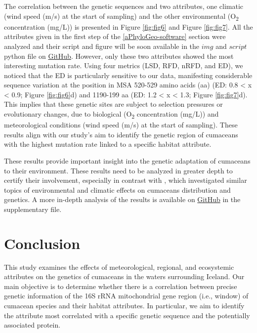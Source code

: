 The correlation between the genetic sequences and two attributes, one climatic (wind speed (m/s) at the start of sampling) and the other environmental (O\textsubscript{2} concentration (mg/L)) is presented in Figure \ref{fig:fig6} and Figure \ref{fig:fig7}. All the attributes given in the first step of the \autoref{aPhyloGeo-software} section were analyzed and their script and figure will be soon available in the $img$ and $script$ python file on \href{https://github.com/tahiri-lab/Cumacea_aPhyloGeo}{GitHub}. However, only these two attributes showed the most interesting mutation rate. Using four metrics (LSD, RFD, nRFD, and ED), we noticed that the ED is particularly sensitive to our data, manifesting considerable sequence variation at the position in MSA 520-529 amino acids (aa) (ED: 0.8 < x < 0.9; Figure \ref{fig:fig6}d) and 1190-199 aa (ED: 1.2 < x < 1.3; Figure \ref{fig:fig7}d). This implies that these genetic sites are subject to selection pressures or evolutionary changes, due to biological (O\textsubscript{2} concentration (mg/L)) and meteorological conditions (wind speed (m/s) at the start of sampling). These results align with our study's aim to identify the genetic region of cumaceans with the highest mutation rate linked to a specific habitat attribute.

These results provide important insight into the genetic adaptation of cumaceans to their environment. These results need to be analyzed in greater depth to certify their involvement, especially in contrast with \citep{uhlir_adding_2021}, which investigated similar topics of environmental and climatic effects on cumaceans distribution and genetics. A more in-depth analysis of the results is available on \href{https://github.com/tahiri-lab/Cumacea_aPhyloGeo}{GitHub} in the supplementary file.

\section{Conclusion}\label{conclusion}
This study examines the effects of meteorological, regional, and ecosystemic attributes on the genetics of cumaceans in the waters surrounding Iceland. Our main objective is to determine whether there is a  correlation between precise genetic information of the 16S rRNA mitochondrial gene region (i.e., window) of cumacean species and their habitat attributes. In particular, we aim to identify the attribute most correlated with a specific genetic sequence and the potentially associated protein.

